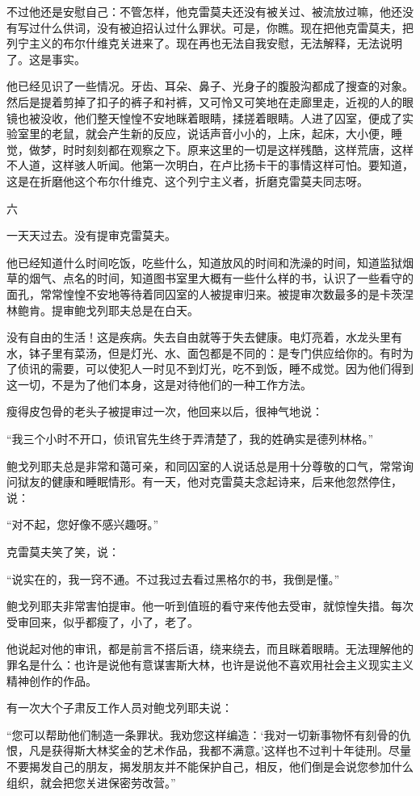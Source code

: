 不过他还是安慰自己：不管怎样，他克雷莫夫还没有被关过、被流放过嘛，他还没有写过什么供词，没有被迫招认过什么罪状。可是，你瞧。现在把他克雷莫夫，把列宁主义的布尔什维克关进来了。现在再也无法自我安慰，无法解释，无法说明了。这是事实。

他已经见识了一些情况。牙齿、耳朵、鼻子、光身子的腹股沟都成了搜查的对象。然后是提着剪掉了扣子的裤子和衬裤，又可怜又可笑地在走廊里走，近视的人的眼镜也被没收，他们整天惶惶不安地眯着眼睛，揉搓着眼睛。人进了囚室，便成了实验室里的老鼠，就会产生新的反应，说话声音小小的，上床，起床，大小便，睡觉，做梦，时时刻刻都在观察之下。原来这里的一切是这样残酷，这样荒唐，这样不人道，这样骇人听闻。他第一次明白，在卢比扬卡干的事情这样可怕。要知道，这是在折磨他这个布尔什维克、这个列宁主义者，折磨克雷莫夫同志呀。

六

一天天过去。没有提审克雷莫夫。

他已经知道什么时间吃饭，吃些什么，知道放风的时间和洗澡的时间，知道监狱烟草的烟气、点名的时间，知道图书室里大概有一些什么样的书，认识了一些看守的面孔，常常惶惶不安地等待着同囚室的人被提审归来。被提审次数最多的是卡茨涅林鲍肯。提审鲍戈列耶夫总是在白天。

没有自由的生活！这是疾病。失去自由就等于失去健康。电灯亮着，水龙头里有水，钵子里有菜汤，但是灯光、水、面包都是不同的：是专门供应给你的。有时为了侦讯的需要，可以使犯人一时见不到灯光，吃不到饭，睡不成觉。因为他们得到这一切，不是为了他们本身，这是对待他们的一种工作方法。

瘦得皮包骨的老头子被提审过一次，他回来以后，很神气地说：

“我三个小时不开口，侦讯官先生终于弄清楚了，我的姓确实是德列林格。”

鲍戈列耶夫总是非常和蔼可亲，和同囚室的人说话总是用十分尊敬的口气，常常询问狱友的健康和睡眠情形。有一天，他对克雷莫夫念起诗来，后来他忽然停住，说：

“对不起，您好像不感兴趣呀。”

克雷莫夫笑了笑，说：

“说实在的，我一窍不通。不过我过去看过黑格尔的书，我倒是懂。”

鲍戈列耶夫非常害怕提审。他一听到值班的看守来传他去受审，就惊惶失措。每次受审回来，似乎都瘦了，小了，老了。

他说起对他的审讯，都是前言不搭后语，绕来绕去，而且眯着眼睛。无法理解他的罪名是什么：也许是说他有意谋害斯大林，也许是说他不喜欢用社会主义现实主义精神创作的作品。

有一次大个子肃反工作人员对鲍戈列耶夫说：

“您可以帮助他们制造一条罪状。我劝您这样编造：‘我对一切新事物怀有刻骨的仇恨，凡是获得斯大林奖金的艺术作品，我都不满意。’这样也不过判十年徒刑。尽量不要揭发自己的朋友，揭发朋友并不能保护自己，相反，他们倒是会说您参加什么组织，就会把您关进保密劳改营。”

